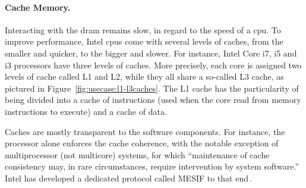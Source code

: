 \paragraph{Cache Memory.}
%
Interacting with the \ac{dram} remains slow, in regard to the speed of a
\ac{cpu}.
%
To improve performance, Intel \acp{cpu} come with several levels of caches, from
the smaller and quicker, to the bigger and slower.
%
For instance, Intel Core i7, i5 and i3 processors have three levels of caches.
%
More precisely, each core is assigned two levels of cache called L1 and L2,
while they all share a so-called L3 cache, as pictured in
Figure~\ref{fig:usecase:l1-l3caches}. 
%
The L1 cache has the particularity of being divided into a cache of instructions
(used when the core read from memory instructions to execute) and a cache of
data.

Caches are mostly transparent to the software components.
%
For instance, the processor alone enforces the cache coherence, with the notable
exception of multiprocessor (not multicore) systems, for which ``maintenance of
cache consistency may, in rare circumstances, require intervention by system
software.''
%
Intel has developed a dedicated protocol called MESIF to that
end\,\cite{thomadakis2011nehalem}.


